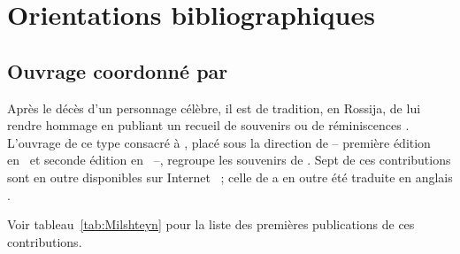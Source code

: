 \section{Orientations bibliographiques}

\subsection{Ouvrage coordonné par \citeauthor{Milshteyn82a}}

Après le décès d'un personnage célèbre, il est de tradition, en Rossija, de
lui rendre hommage en publiant un recueil de souvenirs ou de réminiscences
\citep[voir][p.~xi]{White}.
L'ouvrage de ce type consacré à \VSofronitsky{}, placé sous la direction de
\citeauthor{Milshteyn82a} -- première édition en~\citeyear{Milshteyn70} et
seconde édition en~\citeyear{Milshteyn82a} --, regroupe les souvenirs de
\citet{Milshteyn82b, Sofronitsky82a, Sofronitsky82b, NeuhausH82, Argamakov,
Bogdanov82, Golubovskaya, Savshinsky82, Yudina82, Nekrasova82,
Miklashevskaya, Oborine82, Zak82, Geronimus, Shershevsky, Modyel82,
Shaborkina, Delson82, Tolstoi, Nikonovich82, NeuhausS82, Bashkirov82,
Berman82, Sturtsel, Podolskaya, Lobanov82, Zhukova82, Moroshkina, Bragina,
Alekseiev82, Gorohovsky, Savkevich, Mozhanskaya, Adzhemov, Smirnov,
Panarine, Rumyantsev, Shiryaeva}.
Sept de ces contributions sont en outre disponibles sur Internet
\citep[voir][]{Bashkirov10, Berman10, Neuhaus10, Oborine10, Savshinsky10,
Yudina10, Zak10}~; celle de \MYudina{} a en outre été traduite en anglais
\citep[voir][]{Yudina02}.

Voir tableau~\ref{tab:Milshteyn} pour la liste des premières publications
de ces contributions.

